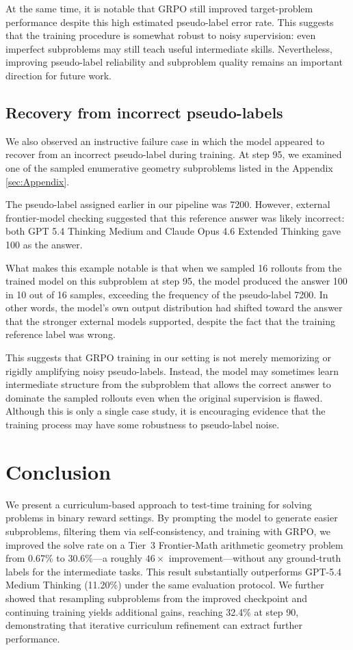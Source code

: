\documentclass{article}
\begin{document}
At the same time, it is notable that GRPO still improved target-problem performance despite this high estimated pseudo-label error rate. This suggests that the training procedure is somewhat robust to noisy supervision: even imperfect subproblems may still teach useful intermediate skills. Nevertheless, improving pseudo-label reliability and subproblem quality remains an important direction for future work.


\subsection{Recovery from incorrect pseudo-labels}

We also observed an instructive failure case in which the model appeared to recover from an incorrect pseudo-label during training. At step 95, we examined one of the sampled enumerative geometry subproblems listed in the Appendix \ref{sec:Appendix}.

The pseudo-label assigned earlier in our pipeline was 7200. However, external frontier-model checking suggested that this reference answer was likely incorrect: both GPT 5.4 Thinking Medium and Claude Opus 4.6 Extended Thinking gave 100 as the answer.

What makes this example notable is that when we sampled 16 rollouts from the trained model on this subproblem at step 95, the model produced the answer 100 in 10 out of 16 samples, exceeding the frequency of the pseudo-label 7200. In other words, the model's own output distribution had shifted toward the answer that the stronger external models supported, despite the fact that the training reference label was wrong.

This suggests that GRPO training in our setting is not merely memorizing or rigidly amplifying noisy pseudo-labels. Instead, the model may sometimes learn intermediate structure from the subproblem that allows the correct answer to dominate the sampled rollouts even when the original supervision is flawed. Although this is only a single case study, it is encouraging evidence that the training process may have some robustness to pseudo-label noise.


\section{Conclusion}
We present a curriculum-based approach to test-time training for solving problems in binary reward settings. By prompting the model to generate easier subproblems, filtering them via self-consistency, and training with GRPO, we improved the solve rate on a Tier~3 Frontier-Math arithmetic geometry problem from 0.67\% to 30.6\%---a roughly $46\times$ improvement---without any ground-truth labels for the intermediate tasks. This result substantially outperforms GPT-5.4 Medium Thinking (11.20\%) under the same evaluation protocol. We further showed that resampling subproblems from the improved checkpoint and continuing training yields additional gains, reaching 32.4\% at step 90, demonstrating that iterative curriculum refinement can extract further performance.
 
\end{document}
